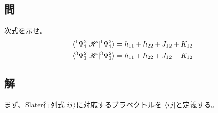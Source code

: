 \subsection{問}
次式を示せ。
\begin{align}
	\braket{^1\Psi_1^2|\H|^1\Psi_1^2}
&=
	h_{11}
	+
	h_{22}
	+
	J_{12}
	+
	K_{12} \\
%
%
	\braket{^3\Psi_1^2|\H|^3\Psi_1^2}
&=
	h_{11}
	+
	h_{22}
	+
	J_{12}
	-
	K_{12}
\end{align}


\subsection{解}
まず、Slater行列式$\ket{ij}$に対応するブラベクトルを
$\bra{ij}$と定義する。

